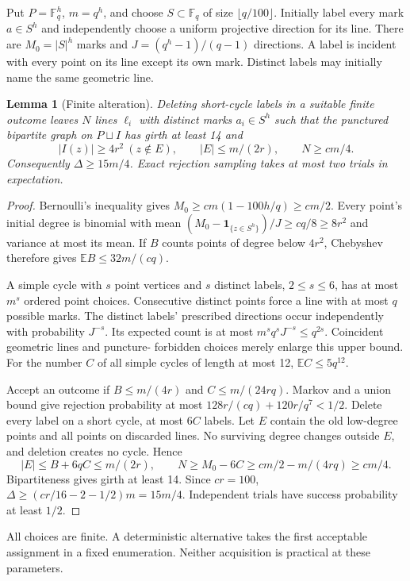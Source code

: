 \documentclass[11pt]{article}
\newtheorem{lemma}[theorem]{Lemma}
\theoremstyle{definition}
\newcommand{\F}{\mathbb F}
\newcommand{\E}{\mathbb E}
\begin{document}
Put $P=\F_q^h$, $m=q^h$, and choose
$S\subset\F_q$ of size $\lfloor q/100\rfloor$. Initially label every
mark $a\in S^h$ and independently choose a uniform projective direction
for its line. There are
$M_0=|S|^h$ marks and $J=(q^h-1)/(q-1)$ directions.
A label is incident with every point on its line except its own mark.
Distinct labels may initially name the same geometric line.

\begin{lemma}[Finite alteration]\label{lem:incidence}
Deleting short-cycle labels in a suitable finite outcome leaves
$N$ lines $\ell_i$ with distinct marks $a_i\in S^h$ such that the
punctured bipartite graph on $P\sqcup I$ has girth at least 14 and
\[
 |I(z)|\ge4r^2\ (z\notin E),\qquad
 |E|\le m/(2r),\qquad N\ge cm/4.
\]
Consequently $\Delta\ge15m/4$. Exact rejection sampling takes at most
two trials in expectation.
\end{lemma}
\begin{proof}
Bernoulli's inequality gives
$M_0\ge cm(1-100h/q)\ge cm/2$.
Every point's initial degree is binomial with mean
$(M_0-\mathbf1_{\{z\in S^h\}})/J\ge cq/8\ge8r^2$ and variance
at most its mean. If $B$ counts points of degree below $4r^2$,
Chebyshev therefore gives $\E B\le32m/(cq)$.

A simple cycle with $s$ point vertices and $s$ distinct labels,
$2\le s\le6$, has at most $m^s$ ordered point choices.
Consecutive distinct points force a line with at most $q$ possible
marks. The distinct labels' prescribed directions occur independently
with probability $J^{-s}$. Its expected count is at most
$m^sq^sJ^{-s}\le q^{2s}$. Coincident geometric lines and puncture-
forbidden choices merely enlarge this upper bound.
For the number $C$ of all simple cycles of length at most 12,
$\E C\le5q^{12}$.

Accept an outcome if $B\le m/(4r)$ and $C\le m/(24rq)$.
Markov and a union bound give rejection probability at most
$128r/(cq)+120r/q^7<1/2$. Delete every label on a short cycle,
at most $6C$ labels. Let $E$ contain the old low-degree points and
all points on discarded lines. No surviving degree changes outside
$E$, and deletion creates no cycle. Hence
\[
 |E|\le B+6qC\le m/(2r),\qquad
 N\ge M_0-6C\ge cm/2-m/(4rq)\ge cm/4.
\]
Bipartiteness gives girth at least 14. Since $cr=100$,
$\Delta\ge(cr/16-2-1/2)m=15m/4$.
Independent trials have success probability at least $1/2$.
\end{proof}

All choices are finite. A deterministic alternative takes the first
acceptable assignment in a fixed enumeration. Neither acquisition is
practical at these parameters.
\end{document}
